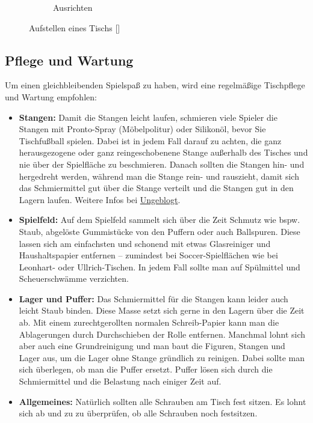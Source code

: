 \begin{figure}
\begin{subfigure}[b]{0.7\textwidth}
\caption{Ausrichten} 
\label{fig:tisch:ausrichten} 
\end{subfigure} 
\label{fig:tisch} 
\caption{Aufstellen eines Tischs [\cite{itsf_basics}]} 
\end{figure}

\subsection{Pflege und Wartung}
\label{tisch:tisch:wartung}

Um einen gleichbleibenden Spielspaß zu haben, wird eine regelmäßige Tischpflege und Wartung empfohlen:
\begin{itemize}  
\item {\normalfont \bfseries Stangen:} Damit die Stangen leicht laufen, schmieren viele Spieler die Stangen mit Pronto-Spray (Möbelpolitur) oder Silikonöl, bevor Sie Tischfußball spielen. Dabei ist in jedem Fall darauf zu achten, die ganz herausgezogene oder ganz reingeschobenene Stange außerhalb des Tisches und nie über der Spielfläche zu beschmieren. Danach sollten die Stangen hin- und hergedreht werden, während man die Stange rein- und rauszieht, damit sich das Schmiermittel gut über die Stange verteilt  und die Stangen gut in den Lagern laufen.
Weitere Infos bei \href{http://ungeblogtkickern.blogspot.de/2014/11/wie-kann-ich-die-stangen-am-besten.html}{Ungeblogt}.
\item {\normalfont \bfseries Spielfeld:} Auf dem Spielfeld sammelt sich über die Zeit Schmutz wie bspw. Staub, abgelöste Gummistücke von den Puffern oder auch Ballspuren. Diese lassen sich am einfachsten und schonend mit etwas Glasreiniger und Haushaltspapier entfernen -- zumindest bei Soccer-Spielflächen wie bei Leonhart- oder Ullrich-Tischen. In jedem Fall sollte man auf Spülmittel und Scheuerschwämme verzichten. 
\item {\normalfont \bfseries Lager und Puffer:} Das Schmiermittel für die Stangen kann leider auch leicht Staub binden. Diese Masse setzt sich gerne in den Lagern über die Zeit ab. Mit einem zurechtgerollten normalen Schreib-Papier kann man die Ablagerungen durch Durchschieben der Rolle entfernen. Manchmal lohnt sich aber auch eine Grundreinigung und man baut die Figuren, Stangen und Lager aus, um die Lager ohne Stange gründlich zu reinigen. Dabei sollte man sich überlegen, ob man die Puffer ersetzt. Puffer lösen sich durch die Schmiermittel und die Belastung nach einiger Zeit auf.    
\item {\normalfont \bfseries Allgemeines:} Natürlich sollten alle Schrauben am Tisch fest sitzen. Es lohnt sich ab und zu zu überprüfen, ob alle Schrauben noch festsitzen.  
\end{itemize}  


